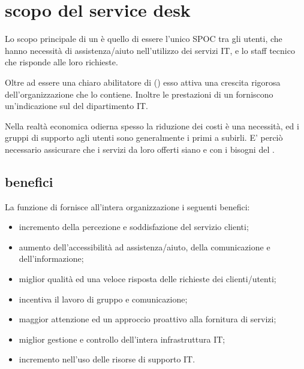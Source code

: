 %
%
\section[Scopo del Service Desk]{scopo del service desk}
\label{sd-scope}
Lo scopo principale di un  è quello di essere l'unico \ac{SPOC} tra gli utenti, che hanno necessità di assistenza/aiuto nell'utilizzo dei servizi \acs{IT}, e lo staff tecnico che risponde alle loro richieste.

Oltre ad essere una chiaro abilitatore di  () esso attiva una crescita rigorosa dell'organizzazione che lo contiene. Inoltre le prestazioni di un  forniscono un'indicazione sul  del dipartimento \acs{IT}.

Nella realtà economica odierna spesso la riduzione dei costi è una necessità, ed i gruppi di supporto agli utenti sono generalmente i primi a subirli. E' perciò necessario assicurare che i servizi da loro offerti siano  e  con i bisogni del .

\subsection[Benefici]{benefici}
\label{sd-benefits}
La funzione di  fornisce all'intera organizzazione i seguenti benefici:

\begin{itemize}
\item{incremento della percezione e soddisfazione del servizio clienti;}
\item{aumento dell'accessibilità ad assistenza/aiuto, della comunicazione e dell'informazione;}
\item{miglior qualità ed una veloce risposta delle richieste dei clienti/utenti;}
\item{incentiva il lavoro di gruppo e comunicazione;}
\item{maggior attenzione ed un approccio proattivo alla fornitura di servizi;}
\item{miglior gestione e controllo dell'intera infrastruttura \acs{IT};}
\item{incremento nell'uso delle risorse di supporto \acs{IT}.}
\end{itemize}

